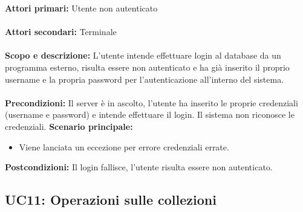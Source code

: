 \documentclass{scalatekids-article}
\begin{document}
\textbf{Attori primari:} Utente non autenticato\\ \\
\textbf{Attori secondari:} Terminale\\ \\
\textbf{Scopo e descrizione:}
L'utente intende effettuare login al database da un programma  esterno, risulta essere non autenticato e ha già inserito il proprio username e la propria password per l'autenticazione all'interno del sistema.\\ \\
\textbf{Precondizioni:} Il server è in ascolto, l'utente ha inserito le proprie credenziali (username e password) e intende effettuare il login. Il sistema non riconosce le credenziali.
\textbf{Scenario principale:}
\begin{itemize}
\item Viene lanciata un eccezione per errore credenziali errate.
\end{itemize}
\textbf{Postcondizioni:} Il login fallisce, l'utente risulta essere non autenticato.

\subsection{UC11: Operazioni sulle collezioni}
\end{document}
